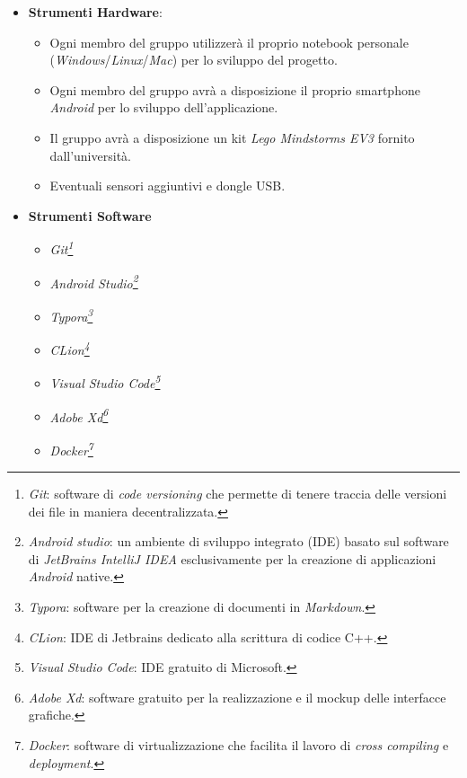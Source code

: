 \documentclass{article}
\begin{document}
  \begin{itemize}
  \item
    \textbf{Strumenti Hardware}:
  
    \begin{itemize}
    \item
      Ogni membro del gruppo utilizzerà il proprio notebook personale
      (\emph{Windows}/\emph{Linux}/\emph{Mac}) per lo sviluppo del
      progetto.
    \item
      Ogni membro del gruppo avrà a disposizione il proprio smartphone
      \emph{Android} per lo sviluppo dell'applicazione.
    \item
      Il gruppo avrà a disposizione un kit \emph{Lego Mindstorms EV3} fornito dall'università.
    \item
      Eventuali sensori aggiuntivi e dongle USB.
    \end{itemize}
  \item
    \textbf{Strumenti Software}
  
    \begin{itemize}
    \item
      \emph{Git\footnote{\emph{Git}: software di \emph{code versioning}
        che permette di tenere traccia delle versioni dei file in maniera
        decentralizzata.}}
    \item
      \emph{Android Studio\footnote{\emph{Android studio}: un ambiente di
        sviluppo integrato (IDE) basato sul software di \emph{JetBrains
        IntelliJ IDEA} esclusivamente per la creazione di applicazioni
        \emph{Android} native.}}
    \item
      \emph{Typora\footnote{\emph{Typora}: software per la creazione di
        documenti in \emph{Markdown}.}}
    \item
      \emph{CLion\footnote{\emph{CLion}: IDE di Jetbrains dedicato alla
        scrittura di codice C++.}}
    \item
      \emph{Visual Studio Code\footnote{\emph{Visual Studio Code}: IDE
        gratuito di Microsoft.}}
    \item
      \emph{Adobe Xd\footnote{\emph{Adobe Xd}: software gratuito per la
        realizzazione e il mockup delle interfacce grafiche.}}
    \item
      \emph{Docker\footnote{\emph{Docker}: software di virtualizzazione
        che facilita il lavoro di \emph{cross compiling} e
        \emph{deployment}.}}
    \end{itemize}
  \end{itemize}
  
\end{document}

